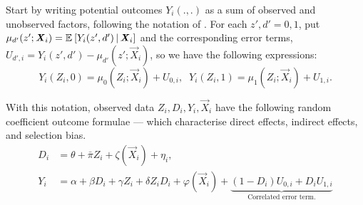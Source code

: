 Start by writing potential outcomes $Y_i(., .)$ as a sum of observed and unobserved factors, following the notation of \cite{heckman2005structural}.
For each $z',d' = 0,1$, put $\mu_{d'}(z'; \boldsymbol{\mathit{X}}_i) = \mathbb{E}_{} \left[ Y_i(z', d') \, \middle\vert \, \boldsymbol{\mathit{X}}_i \right]$ and the corresponding error terms, $U_{d', i} = Y_i(z', d') - \mu_{d'}(z'; \vec X_i)$, so we have the following expressions:
\[ Y_i(Z_i, 0)  = \mu_{0}(Z_i; \vec X_i) + U_{0,i}, \;\;
    Y_i(Z_i, 1) = \mu_{1}(Z_i; \vec X_i) + U_{1,i}. \]

With this notation, observed data $Z_i, D_i, Y_i, \vec X_i$ have the following random coefficient outcome formulae --- which characterise direct effects, indirect effects, and selection bias.
\begin{align}
    \label{eqn:parametric-firststage}
    D_i &= \theta + \bar \pi Z_i + \zeta(\vec X_i) + \eta_i,  \\
    \label{eqn:parametric-secondstage}
    Y_i &= \alpha + \beta D_i + \gamma Z_i + \delta Z_i D_i
    + \varphi(\vec X_i)
    + \underbrace{ \left(1 - D_i \right) U_{0,i} + D_i U_{1,i}}_{
        \text{Correlated error term.}}
\end{align}

